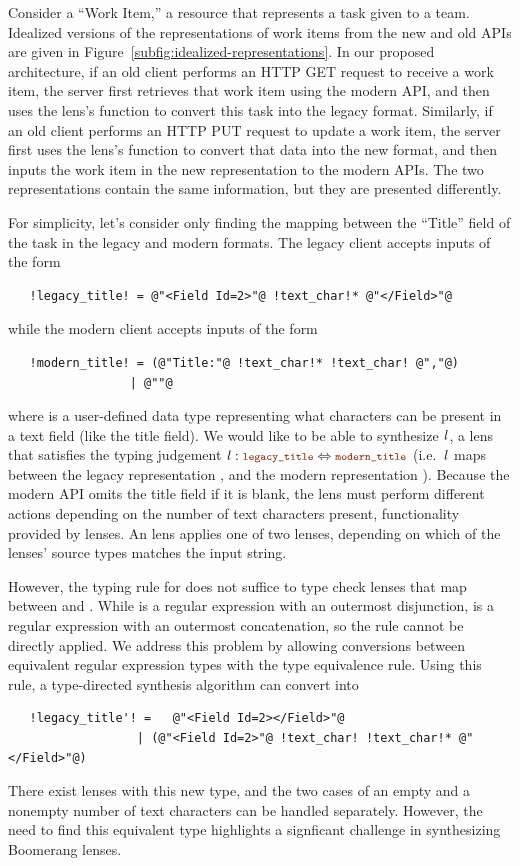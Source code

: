 \documentclass[acmsmall]{acmart}
\begin{document}
Consider a ``Work Item,'' a resource that represents a task given to a
team.  Idealized versions of the representations of work items from the new and
old APIs are given in Figure~\ref{subfig:idealized-representations}.  In our
proposed architecture, if an old
client performs an HTTP GET request to receive a work item, the server first
retrieves that work item using the modern API, and then uses the
lens's \PutLeft{} function to convert this task into the legacy format.  Similarly,
if an old client performs an HTTP PUT request to update a work item, the server
first uses the lens's 
\PutRight{} function to convert that data into the
new format, and then inputs the work item in the new representation to the modern APIs.  The two
representations contain the same information, but they are presented
differently.

For simplicity, let's consider only finding the mapping between the ``Title''
field of the task in the legacy and modern formats.
The legacy client accepts inputs of the form 
%
\begin{lstlisting}
   !legacy_title! = @"<Field Id=2>"@ !text_char!* @"</Field>"@
\end{lstlisting}
while the modern client accepts inputs of the form
\begin{lstlisting}
   !modern_title! = (@"Title:"@ !text_char!* !text_char! @","@)
                 | @""@
\end{lstlisting}
%
where \TextChar{} is a user-defined data type representing what characters can
be present in a text field (like the title field).
We would like to be able to synthesize $\mathit{l}$, a lens that satisfies the
typing judgement $\Lens \OfType \LegacyTitle{} \Leftrightarrow \ModernTitle$
(i.e.\ $\mathit{l}$ maps between the legacy representation \LegacyTitle{}, and the modern
representation \ModernTitle{}).
Because the modern API omits the title field if it is blank, the lens must
perform different 
actions depending on the number of text characters present,
functionality provided by \OrLens{} lenses.
An \OrLens{} lens applies one of two lenses, depending on which of the lenses'
source types matches the input string.

However, the typing rule for \OrLens{} does not suffice to type check lenses
that map between \LegacyTitle{} and \ModernTitle{}.  While
 is a regular expression with an
outermost disjunction, 
is a regular expression with an outermost concatenation, so the rule cannot be
directly applied.
We address this problem by allowing conversions between equivalent
regular expression types with the type equivalence rule.
Using this rule, a type-directed synthesis algorithm can convert
\LegacyTitle{} into
%
\begin{lstlisting}
   !legacy_title'! =   @"<Field Id=2></Field>"@
                  | (@"<Field Id=2>"@ !text_char! !text_char!* @"</Field>"@)
\end{lstlisting}
%
There exist \OrLens{} lenses with this new type, and the two cases of an empty
and a nonempty number of text characters can be handled separately.  However,
the need to find this equivalent type highlights a signficant challenge in
synthesizing Boomerang lenses.
\end{document}
